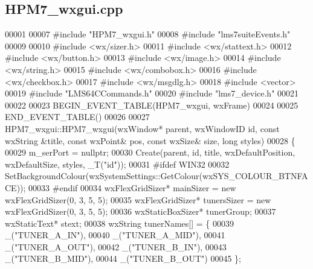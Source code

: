 \subsection{H\+P\+M7\+\_\+wxgui.\+cpp}
\label{HPM7__wxgui_8cpp_source}

\begin{DoxyCode}
00001 
00007 \textcolor{preprocessor}{#include "HPM7_wxgui.h"}
00008 \textcolor{preprocessor}{#include "lms7suiteEvents.h"}
00009 
00010 \textcolor{preprocessor}{#include <wx/sizer.h>}
00011 \textcolor{preprocessor}{#include <wx/stattext.h>}
00012 \textcolor{preprocessor}{#include <wx/button.h>}
00013 \textcolor{preprocessor}{#include <wx/image.h>}
00014 \textcolor{preprocessor}{#include <wx/string.h>}
00015 \textcolor{preprocessor}{#include <wx/combobox.h>}
00016 \textcolor{preprocessor}{#include <wx/checkbox.h>}
00017 \textcolor{preprocessor}{#include <wx/msgdlg.h>}
00018 \textcolor{preprocessor}{#include <vector>}
00019 \textcolor{preprocessor}{#include "LMS64CCommands.h"}
00020 \textcolor{preprocessor}{#include "lms7_device.h"}
00021 
00022 
00023 BEGIN\_EVENT\_TABLE(HPM7_wxgui, wxFrame)
00024 
00025 END\_EVENT\_TABLE()
00026 
00027 HPM7_wxgui::HPM7_wxgui(wxWindow* parent, wxWindowID \textcolor{keywordtype}{id}, const wxString &title, const wxPoint& pos, const 
      wxSize& size, \textcolor{keywordtype}{long} styles)
00028 \{
00029     m\_serPort = \textcolor{keyword}{nullptr};
00030     Create(parent, \textcolor{keywordtype}{id}, title, wxDefaultPosition, wxDefaultSize, styles, \_T(\textcolor{stringliteral}{"id"}));
00031 \textcolor{preprocessor}{#ifdef WIN32}
00032     SetBackgroundColour(wxSystemSettings::GetColour(wxSYS\_COLOUR\_BTNFACE));
00033 \textcolor{preprocessor}{#endif}
00034     wxFlexGridSizer* mainSizer = \textcolor{keyword}{new} wxFlexGridSizer(0, 3, 5, 5);
00035     wxFlexGridSizer* tunersSizer = \textcolor{keyword}{new} wxFlexGridSizer(0, 3, 5, 5);
00036     wxStaticBoxSizer* tunerGroup;
00037     wxStaticText* stext;
00038     wxString tunerNames[] = \{
00039         \_(\textcolor{stringliteral}{"TUNER\_A\_IN"}),
00040         \_(\textcolor{stringliteral}{"TUNER\_A\_MID"}),
00041         \_(\textcolor{stringliteral}{"TUNER\_A\_OUT"}),
00042         \_(\textcolor{stringliteral}{"TUNER\_B\_IN"}),
00043         \_(\textcolor{stringliteral}{"TUNER\_B\_MID"}),
00044         \_(\textcolor{stringliteral}{"TUNER\_B\_OUT"})
00045     \};

\end{DoxyCode}
